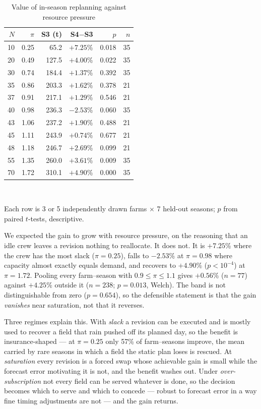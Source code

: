 \documentclass[10pt,twocolumn]{article}
\begin{document}
\begin{table}[t]
\centering
\caption{Value of in-season replanning against resource pressure}
\label{tab:pressure}
\footnotesize
\begin{tabular}{rrrrrr}
\hline
$N$ & $\pi$ & S3 (t) & S4$-$S3 & $p$ & $n$ \\
\hline
10 & 0.25 & 65.2 & $+7.25$\% & 0.018 & 35 \\
20 & 0.49 & 127.5 & $+4.00$\% & 0.022 & 35 \\
30 & 0.74 & 184.4 & $+1.37$\% & 0.392 & 35 \\
35 & 0.86 & 203.3 & $+1.62$\% & 0.378 & 21 \\
37 & 0.91 & 217.1 & $+1.29$\% & 0.546 & 21 \\
40 & 0.98 & 236.3 & $-2.53$\% & 0.060 & 35 \\
43 & 1.06 & 237.2 & $+1.90$\% & 0.488 & 21 \\
45 & 1.11 & 243.9 & $+0.74$\% & 0.677 & 21 \\
48 & 1.18 & 246.7 & $+2.69$\% & 0.099 & 21 \\
55 & 1.35 & 260.0 & $+3.61$\% & 0.009 & 35 \\
70 & 1.72 & 310.1 & $+4.90$\% & 0.000 & 35 \\
\hline
\end{tabular}
\\[2pt]
\footnotesize\raggedright Each row is 3 or 5 independently drawn farms
$\times$ 7 held-out seasons; $p$ from paired $t$-tests, descriptive.
\end{table}

We expected the gain to grow with resource pressure, on the reasoning
that an idle crew leaves a revision nothing to reallocate. It does not.
It is $+7.25$\% where the crew has the most
slack ($\pi = 0.25$), falls to
$-2.53$\% at $\pi = 0.98$ where capacity almost
exactly equals demand, and recovers to $+4.90$\%
($p < 10^{-4}$) at $\pi = 1.72$.
Pooling every farm--season with
$0.9 \le \pi \le 1.1$ gives
$+0.56$\% ($n = 77$) against
$+4.25$\% outside it ($n = 238$;
$p = 0.013$, Welch). The band is not
distinguishable from zero ($p = 0.654$), so the
defensible statement is that the gain \emph{vanishes} near
saturation, not that it reverses.

Three regimes explain this. With \emph{slack} a revision can be
executed and is mostly used to recover a field that rain pushed off
its planned day, so the benefit is insurance-shaped --- at
$\pi = 0.25$ only
57\% of
farm--seasons improve, the mean carried by rare seasons in which a
field the static plan loses is rescued. At \emph{saturation} every
revision is a forced swap whose achievable gain is small while the
forecast error motivating it is not, and the benefit washes out.
Under \emph{over-subscription} not every field can be served whatever
is done, so the decision becomes which to serve and which to concede
--- robust to forecast error in a way fine timing adjustments are not
--- and the gain returns.
\end{document}
